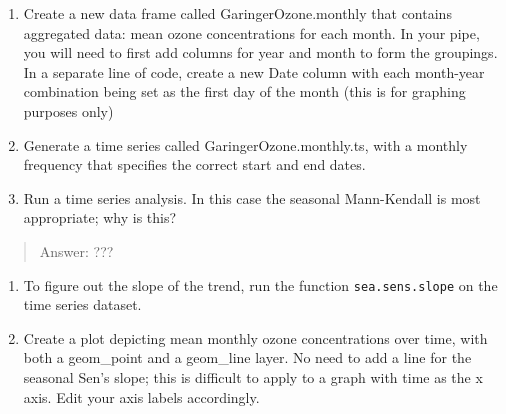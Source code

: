 \documentclass[]{article}
\begin{document}
\begin{enumerate}
\def\labelenumi{\arabic{enumi}.}
\setcounter{enumi}{8}
\item
  Create a new data frame called GaringerOzone.monthly that contains
  aggregated data: mean ozone concentrations for each month. In your
  pipe, you will need to first add columns for year and month to form
  the groupings. In a separate line of code, create a new Date column
  with each month-year combination being set as the first day of the
  month (this is for graphing purposes only)
\item
  Generate a time series called GaringerOzone.monthly.ts, with a monthly
  frequency that specifies the correct start and end dates.
\item
  Run a time series analysis. In this case the seasonal Mann-Kendall is
  most appropriate; why is this?
\end{enumerate}

\begin{quote}
Answer: ???
\end{quote}

\begin{enumerate}
\def\labelenumi{\arabic{enumi}.}
\setcounter{enumi}{11}
\item
  To figure out the slope of the trend, run the function
  \texttt{sea.sens.slope} on the time series dataset.
\item
  Create a plot depicting mean monthly ozone concentrations over time,
  with both a geom\_point and a geom\_line layer. No need to add a line
  for the seasonal Sen's slope; this is difficult to apply to a graph
  with time as the x axis. Edit your axis labels accordingly.
\end{enumerate}
\end{document}
